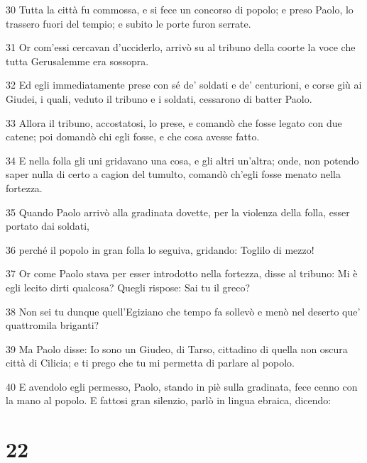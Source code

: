 \par 30 Tutta la città fu commossa, e si fece un concorso di popolo; e preso Paolo, lo trassero fuori del tempio; e subito le porte furon serrate.
\par 31 Or com'essi cercavan d'ucciderlo, arrivò su al tribuno della coorte la voce che tutta Gerusalemme era sossopra.
\par 32 Ed egli immediatamente prese con sé de' soldati e de' centurioni, e corse giù ai Giudei, i quali, veduto il tribuno e i soldati, cessarono di batter Paolo.
\par 33 Allora il tribuno, accostatosi, lo prese, e comandò che fosse legato con due catene; poi domandò chi egli fosse, e che cosa avesse fatto.
\par 34 E nella folla gli uni gridavano una cosa, e gli altri un'altra; onde, non potendo saper nulla di certo a cagion del tumulto, comandò ch'egli fosse menato nella fortezza.
\par 35 Quando Paolo arrivò alla gradinata dovette, per la violenza della folla, esser portato dai soldati,
\par 36 perché il popolo in gran folla lo seguiva, gridando: Toglilo di mezzo!
\par 37 Or come Paolo stava per esser introdotto nella fortezza, disse al tribuno: Mi è egli lecito dirti qualcosa? Quegli rispose: Sai tu il greco?
\par 38 Non sei tu dunque quell'Egiziano che tempo fa sollevò e menò nel deserto que' quattromila briganti?
\par 39 Ma Paolo disse: Io sono un Giudeo, di Tarso, cittadino di quella non oscura città di Cilicia; e ti prego che tu mi permetta di parlare al popolo.
\par 40 E avendolo egli permesso, Paolo, stando in piè sulla gradinata, fece cenno con la mano al popolo. E fattosi gran silenzio, parlò in lingua ebraica, dicendo:

\chapter{22}

